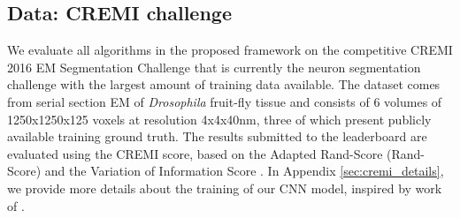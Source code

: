 \subsection{Data: CREMI challenge} \label{sec:cremi_challenge}
We evaluate all algorithms in the proposed framework on the competitive CREMI 2016 EM Segmentation Challenge \cite{cremiChallenge} that is currently the neuron segmentation challenge with the largest amount of training data available. The dataset comes from serial section EM of \emph{Drosophila} fruit-fly tissue and consists of 6 volumes of 1250x1250x125 voxels at resolution 4x4x40nm, three of which present publicly available training ground truth. The results submitted to the leaderboard are evaluated using the CREMI score, based on the Adapted Rand-Score (Rand-Score) and the Variation of Information Score \cite{arganda2015crowdsourcing}. In Appendix \ref{sec:cremi_details}, we provide more details about the training of our CNN model, inspired by work of \cite{lee2017superhuman,funke2018large}.
